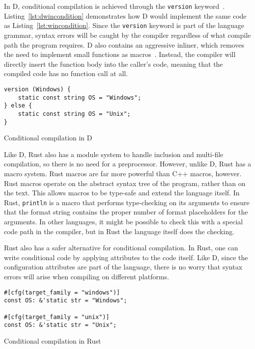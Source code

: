 \documentclass[finalcopy]{srpaper}
\begin{document}
In D, conditional compilation is achieved through the \texttt{version}
keyword~\cite{Armaly:2007:DPL:1234292.1234301}. Listing~\ref{lst:dwincondition}
demonstrates how D would implement the same code as
Listing~\ref{lst:wincondition}. Since the \texttt{version} keyword is part of
the language grammar, syntax errors will be caught by the compiler regardless
of what compile path the program requires. D also contains an aggressive
inliner, which removes the need to implement small functions as
macros~\cite{pretod}. Instead, the compiler will directly insert the function
body into the caller's code, meaning that the compiled code has no function
call at all.

\begin{listing}[H]
\begin{verbatim}
version (Windows) {
    static const string OS = "Windows";
} else {
    static const string OS = "Unix";
}
\end{verbatim}
\caption{Conditional compilation in D}
\label{lst:dwincondition}
\end{listing}

Like D, Rust also has a module system to handle inclusion and multi-file
compilation, so there is no need for a preprocessor. However, unlike D, Rust
has a macro system. Rust macros are far more powerful than C++ macros, however.
Rust macros operate on the abstract syntax tree of the program, rather than on
the text. This allows macros to be type-safe and extend the language itself. In
Rust, \texttt{println} is a macro that performs type-checking on its arguments
to ensure that the format string contains the proper number of format
placeholders for the arguments. In other languages, it might be possible to
check this with a special code path in the compiler, but in Rust the language
itself does the checking.

Rust also has a safer alternative for conditional compilation. In Rust, one
can write conditional code by applying attributes to the code itself. Like D,
since the configuration attributes are part of the language, there is no worry
that syntax errors will arise when compiling on different platforms.

\begin{listing}[H]
\begin{verbatim}
#[cfg(target_family = "windows")]
const OS: &'static str = "Windows";

#[cfg(target_family = "unix")]
const OS: &'static str = "Unix";
\end{verbatim}
\caption{Conditional compilation in Rust}
\label{lst:dwincondition}
\end{listing}
\end{document}
